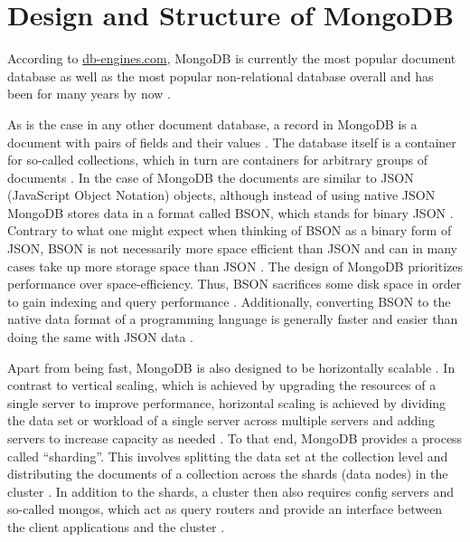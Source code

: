 
\section{Design and Structure of MongoDB}
According to \url{db-engines.com}, MongoDB is currently the most popular document database as well as the most popular non-relational database overall
and has been for many years by now \parencite{DB-Engines-Ranking, DB-Engines-Trend}. 

As is the case in any other document database, a record in MongoDB is a document with pairs of fields and their values \parencite[p. 90]{chauhan2019review}. 
The database itself is a container for so-called collections, which in turn are containers for arbitrary groups of documents \parencite[p. 90]{chauhan2019review}.
In the case of MongoDB the documents are similar to JSON (JavaScript Object Notation) objects, although instead of using native JSON MongoDB stores data 
in a format called BSON, which stands for binary JSON \parencites[p. 4]{Membrey2014}[p. 90]{chauhan2019review}. Contrary to what one might expect when 
thinking of BSON as a binary form of JSON, BSON is not necessarily more space efficient than JSON and can in many cases take up more storage space than JSON \parencite[p. 11]{Membrey2014}. 
The design of MongoDB prioritizes performance over space-efficiency. Thus, BSON sacrifices some disk space in order to gain indexing and query performance \parencite[p. 11]{Membrey2014}.
Additionally, converting BSON to the native data format of a programming language is generally faster and easier than doing the same with JSON data \parencite[p. 11]{Membrey2014}. 

Apart from being fast, MongoDB is also designed to be horizontally scalable \parencite[pp. 2, 6-7]{Membrey2014}. In contrast to vertical scaling, which is achieved by upgrading the resources
of a single server to improve performance, horizontal scaling is achieved by dividing the data set or workload of a single server across multiple servers and adding
servers to increase capacity as needed \parencite{Mongo-Sharding}. To that end, MongoDB provides a process called \enquote{sharding}. This involves splitting the 
data set at the collection level and distributing the documents of a collection across the shards (data nodes) in the cluster \parencites{Mongo-Sharding}[p. 7]{Membrey2014}.
In addition to the shards, a cluster then also requires config servers and so-called mongos, which act as query routers and provide an interface between the 
client applications and the cluster \parencite{Mongo-Sharding}.

